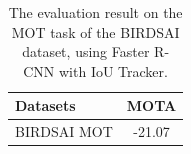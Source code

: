 \documentclass[
]{article}
\begin{document}
\begin{table}[h]
\centering
\begin{tabular}{|l|c|}
\hline
\textbf{Datasets} & \textbf{MOTA} \\
\hline
BIRDSAI MOT & -21.07 \\
\hline
\end{tabular}
\caption{The evaluation result on the MOT task of the BIRDSAI dataset\cite{bondi2020birdsai}, using Faster R-CNN with IoU Tracker.}
\label{tab:birdsai_mot}
\end{table}





\end{document}
